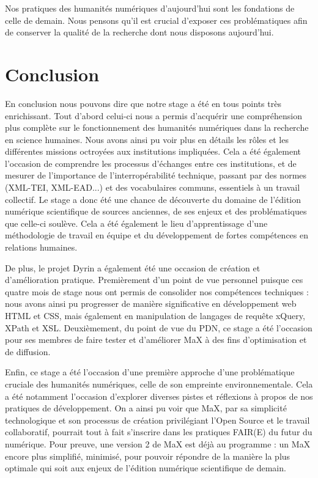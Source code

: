 \documentclass[a4paper,12pt,twoside]{book}
\begin{document}
Nos pratiques des humanités numériques d'aujourd'hui sont les fondations de celle de demain. Nous pensons qu'il est crucial d'exposer ces problématiques afin de conserver la qualité de la recherche dont nous disposons aujourd'hui.

\clearpage

\chapter*{Conclusion}

En conclusion nous pouvons dire que notre stage a été en tous points très enrichissant. Tout d'abord celui-ci nous a permis d'acquérir une compréhension plus complète sur le fonctionnement des humanités numériques dans la recherche en science humaines. Nous avons ainsi pu voir plus en détails les rôles et les différentes missions octroyées aux institutions impliquées. Cela a été également l'occasion de comprendre les processus d'échanges entre ces institutions, et de mesurer de l'importance de l'interropérabilité technique, passant par des normes (XML-TEI, XML-EAD...) et des vocabulaires communs, essentiels à un travail collectif. Le stage a donc été une chance de découverte du domaine de l'édition numérique scientifique de sources anciennes, de ses enjeux et des problématiques que celle-ci soulève. Cela a été également le lieu d'apprentissage d'une méthodologie de travail en équipe et du développement de fortes compétences en relations humaines.


De plus, le projet Dyrin a également été une occasion de création et d'amélioration pratique. Premièrement d'un point de vue personnel puisque ces quatre mois de stage nous ont permis de consolider nos compétences techniques : nous avons ainsi pu progresser de manière significative en développement web HTML et CSS, mais également en manipulation de langages de requête xQuery, XPath et XSL. Deuxièmement, du point de vue du \acrshort{PDN}, ce stage a été l'occasion pour ses membres de faire tester et d'améliorer MaX à des fins d'optimisation et de diffusion.

Enfin, ce stage a été l'occasion d'une première approche d'une problématique cruciale des humanités numériques, celle de son empreinte environnementale. Cela a été notamment l'occasion d'explorer diverses pistes et réflexions à propos de nos pratiques de développement. On a ainsi pu voir que MaX, par sa simplicité technologique et son processus de création privilégiant l'Open Source et le travail collaboratif, pourrait tout à fait s'inscrire dans les pratiques FAIR(E) du futur du numérique. Pour preuve, une version 2 de MaX est déjà au programme : un MaX encore plus simplifié, minimisé, pour pouvoir répondre de la manière la plus optimale qui soit aux enjeux de l'édition numérique scientifique de demain.


\printglossary[type=\acronymtype]

\listoffigures

\listoftables

\printbibliography

\tableofcontents
\end{document}
